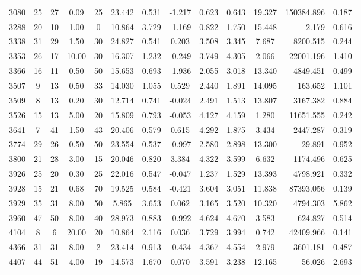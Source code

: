 \documentclass[mnsc]{informs3}
\begin{document}
\begin{APPENDICES}
\begin{longtable}{cccccccccccrc}
3080 & 25 & 27 & 0.09 & 25 & 23.442 & 0.531 & -1.217 & 0.623 & 0.643 & 19.327 & 150384.896 & 0.187 \\
3288 & 20 & 10 & 1.00 & 0 & 10.864 & 3.729 & -1.169 & 0.822 & 1.750 & 15.448 & 2.179 & 0.616 \\
3338 & 31 & 29 & 1.50 & 30 & 24.827 & 0.541 & 0.203 & 3.508 & 3.345 & 7.687 & 8200.515 & 0.244 \\
3353 & 26 & 17 & 10.00 & 30 & 16.307 & 1.232 & -0.249 & 3.749 & 4.305 & 2.066 & 22001.196 & 1.410 \\
3366 & 16 & 11 & 0.50 & 50 & 15.653 & 0.693 & -1.936 & 2.055 & 3.018 & 13.340 & 4849.451 & 0.499 \\
3507 & 9 & 13 & 0.50 & 33 & 14.030 & 1.055 & 0.529 & 2.440 & 1.891 & 14.095 & 163.652 & 1.101 \\
3509 & 8 & 13 & 0.20 & 30 & 12.714 & 0.741 & -0.024 & 2.491 & 1.513 & 13.807 & 3167.382 & 0.884 \\
3526 & 15 & 13 & 5.00 & 20 & 15.809 & 0.793 & -0.053 & 4.127 & 4.159 & 1.280 & 11651.555 & 0.242 \\
3641 & 7 & 41 & 1.50 & 43 & 20.406 & 0.579 & 0.615 & 4.292 & 1.875 & 3.434 & 2447.287 & 0.319 \\
3774 & 29 & 26 & 0.50 & 50 & 23.554 & 0.537 & -0.997 & 2.580 & 2.898 & 13.300 & 29.891 & 0.952 \\
3800 & 21 & 28 & 3.00 & 15 & 20.046 & 0.820 & 3.384 & 4.322 & 3.599 & 6.632 & 1174.496 & 0.625 \\
3926 & 25 & 20 & 0.30 & 25 & 22.016 & 0.547 & -0.047 & 1.237 & 1.529 & 13.393 & 4798.921 & 0.332 \\
3928 & 15 & 21 & 0.68 & 70 & 19.525 & 0.584 & -0.421 & 3.604 & 3.051 & 11.838 & 87393.056 & 0.139 \\
3929 & 35 & 31 & 8.00 & 50 & 5.865 & 3.653 & 0.062 & 3.165 & 3.520 & 10.320 & 4794.303 & 5.862 \\
3960 & 47 & 50 & 8.00 & 40 & 28.973 & 0.883 & -0.992 & 4.624 & 4.670 & 3.583 & 624.827 & 0.514 \\
4104 & 8 & 6 & 20.00 & 20 & 10.864 & 2.116 & 0.036 & 3.729 & 3.994 & 0.742 & 42409.966 & 0.141 \\
4366 & 31 & 31 & 8.00 & 2 & 23.414 & 0.913 & -0.434 & 4.367 & 4.554 & 2.979 & 3601.181 & 0.487 \\
4407 & 44 & 51 & 4.00 & 19 & 14.573 & 1.670 & 0.070 & 3.591 & 3.238 & 12.165 & 56.026 & 2.693 \\

\end{longtable}
\end{APPENDICES}
\end{document}
